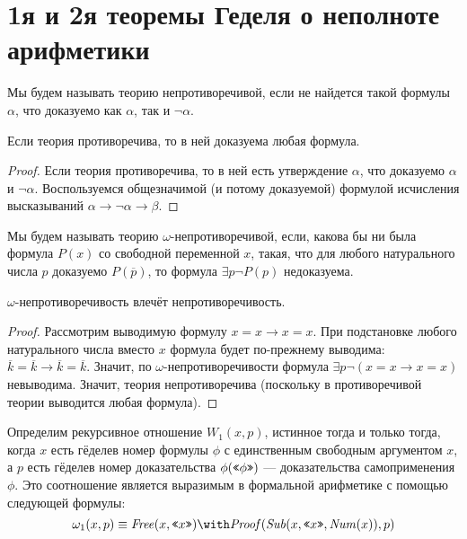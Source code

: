 \section{1я и 2я теоремы Геделя о неполноте арифметики}

\begin{definition}Мы будем называть теорию непротиворечивой, если
не найдется такой формулы $\alpha$, что доказуемо как $\alpha$, так и $\neg \alpha$.
\end{definition}

\begin{lemma}
Если теория противоречива, то в ней доказуема любая формула.
\end{lemma}
\begin{proof}
Если теория противоречива, то в ней есть утверждение $\alpha$, что доказуемо $\alpha$ и $\neg \alpha$.
Воспользуемся общезначимой (и потому доказуемой) формулой исчисления высказываний 
$\alpha \rightarrow \neg \alpha \rightarrow \beta$.
\end{proof}

\begin{definition}Мы будем называть теорию $\omega$-непротиворечивой,
если, какова бы ни была формула $P(x)$ со свободной переменной $x$, 
такая, что для любого натурального числа $p$ доказуемо $P(\overline{p})$, 
то формула $\exists p \neg P(p)$ недоказуема.
\end{definition}

\begin{lemma}
$\omega$-непротиворечивость влечёт непротиворечивость.
\end{lemma}

\begin{proof}
Рассмотрим выводимую формулу $x=x \rightarrow x=x$.
При подстановке любого натурального числа вместо $x$
формула будет по-прежнему выводима: $\overline{k} = \overline{k} \rightarrow \overline{k}=\overline{k}$.
Значит, по $\omega$-непротиворечивости формула $\exists p \neg (x=x \rightarrow x=x)$ невыводима.
Значит, теория непротиворечива (поскольку в противоречивой теории выводится любая формула).
\end{proof}

Определим рекурсивное отношение $W_1(x,p)$,
истинное тогда и только тогда, когда $x$ есть гёделев номер формулы
$\phi$ с единственным свободным аргументом $x$, а $p$ есть гёделев номер 
доказательства $\phi(\texttt{<<}\phi\texttt{>>})$ --- доказательства 
самоприменения $\phi$. 
Это соотношение является выразимым в формальной арифметике с помощью следующей формулы:
$$\omega_1(x,p) \equiv \mathit{Free}(x,\gq{x}) \with \mathit{Proof} (\mathit{Sub}(x,\gq{x},\mathit{Num}(x)),p)$$

